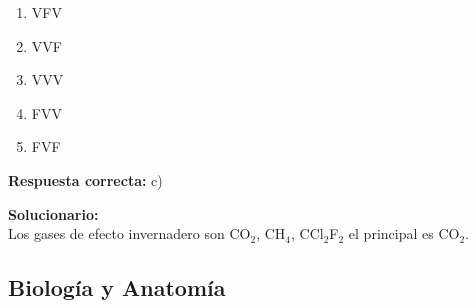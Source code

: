 \begin{enumerate}
	\begin{enumerate}[label=\alph*)]
		\item VFV
		\item VVF
		\item VVV
		\item FVV
		\item FVF
	\end{enumerate}
	
	\textbf{Respuesta correcta:} c)
	
	\vspace{2mm}
	\textbf{Solucionario:}\\
	
	
	Los gases de efecto invernadero son CO$_2$, CH$_4$, CCl$_2$F$_2$ el principal es CO$_2$.
	
	\vspace{6mm}
	
	
\end{enumerate}



\subsection*{Biología y Anatomía}

